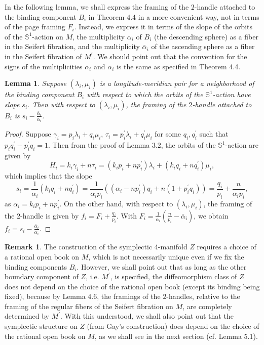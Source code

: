 \documentclass[11pt]{amsart}
\theoremstyle{plain}
\numberwithin{theorem}{section}
\newtheorem{lemma}[theorem]{Lemma}
\theoremstyle{definition}
\newtheorem{remark}[theorem]{Remark}
\newcommand{\s}{{\mathbb S}}
\begin{document}
In the following lemma, we shall express the framing of the $2$-handle attached to the binding component $B_i$ in Theorem 4.4 in a more convenient way, not in terms of the page framing $F_i$.
Instead, we express it in terms of the slope of the orbits of the $\s^1$-action on $M$, the multiplicity
$\alpha_i$ of $B_i$ (the descending sphere) as a fiber in the Seifert fibration, and the multiplicity 
$\bar{\alpha}_i$ of the ascending sphere as a fiber in the Seifert fibration of $M^\prime$. We should point out that the convention for the signs of the multiplicities $\alpha_i$ and $\bar{\alpha}_i$ is the same as specified in Theorem 4.4.

\begin{lemma}
Suppose $(\lambda_i,\mu_i)$ is a longitude-meridian pair for a neighborhood of the binding component $B_i$ with respect to which the orbits of the $\s^1$-action have slope $s_i$. Then
with respect to $(\lambda_i,\mu_i)$, the framing of the $2$-handle attached to $B_i$ is 
$s_i-\frac{\bar{\alpha}_i}{\alpha_i}$. 
\end{lemma}

\begin{proof}
Suppose $\gamma_i=p_i\lambda_i+q_i\mu_i$, $\tau_i=p_i^\prime\lambda_i+q^\prime_i\mu_i$ for
some $q_i,q_i^\prime$ such that $p_iq_i^\prime-p_i^\prime q_i=1$. Then from the proof of 
Lemma 3.2, the orbits of the $\s^1$-action are given by 
$$
H_i=k_i\gamma_i+n\tau_i=(k_ip_i+np_i^\prime)\lambda_i+(k_iq_i+nq_i^\prime)\mu_i,
$$
which implies that the slope 
$$
s_i=\frac{1}{\alpha_i}(k_iq_i+nq_i^\prime)
=\frac{1}{\alpha_ip_i}((\alpha_i-np_i^\prime)q_i+n(1+p_i^\prime q_i))=\frac{q_i}{p_i}
+\frac{n}{\alpha_i p_i}, 
$$
as $\alpha_i=k_ip_i+np_i^\prime$. On the other hand, with respect to $(\lambda_i,\mu_i)$,
the framing of the $2$-handle is given by $f_i=F_i+\frac{q_i}{p_i}$. With 
$F_i=\frac{1}{\alpha_i}(\frac{n}{p_i}-\bar{\alpha}_i)$, we obtain $f_i=s_i-\frac{\bar{\alpha}_i}{\alpha_i}$.

\end{proof}

\begin{remark}
The construction of the symplectic $4$-manifold $Z$ requires a choice of a rational open book 
on $M$, which is not necessarily unique even if we fix the binding components $B_i$. However, 
we shall point out that as long as the other boundary component of $Z$, i.e. $M^\prime$, is 
specified, the diffeomorphism class of $Z$ does not depend on the choice of the rational open book (except its binding being fixed), because by Lemma 4.6, the framings of the $2$-handles, relative to the framing of the regular fibers of the Seifert fibration on $M$, are completely determined by $M^\prime$. With this understood, we shall also point out that the symplectic structure on 
$Z$ (from Gay's construction) does depend on the choice of the rational open book on $M$, as we shall see
in the next section (cf. Lemma 5.1).

\end{remark}
\end{document}
